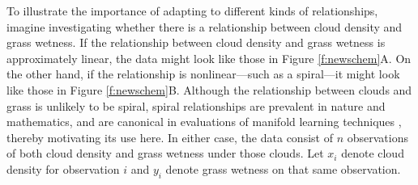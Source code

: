 \documentclass[11pt]{article}
\begin{document}
To illustrate the importance of adapting to different kinds of relationships, imagine investigating whether there is a relationship between cloud density and grass wetness. If the relationship between cloud density and grass wetness is approximately linear, the data might look like those in Figure \ref{f:newschem}{\color{magenta}A}. 
On the other hand, if the relationship is nonlinear---such as a  spiral---it might look like those in Figure \ref{f:newschem}{\color{magenta}B}.
Although the relationship between clouds and grass is unlikely to be spiral, spiral relationships are prevalent in nature and mathematics, and are canonical in evaluations of manifold learning techniques \cite{Lee07a}, thereby motivating its use here.
In either case, the data consist of $n$ observations of both cloud density and grass wetness under those clouds.
Let $x_i$ denote cloud density for observation $i$ and $y_i$ denote grass wetness on that same observation. 
\end{document}
